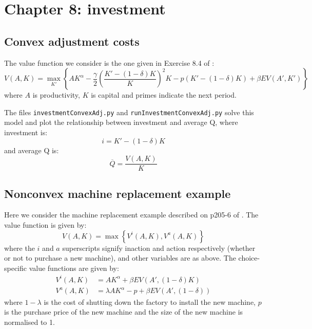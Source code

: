 \section{Chapter 8: investment}

\subsection{Convex adjustment costs} \label{sub:convex}

The value function we consider is the one given in Exercise 8.4 of \citet{adda2003dynamic}:
%
\begin{equation}
	V(A, K) = \max_{K'} \left\{ AK^{\alpha} - \frac{\gamma}{2}\left(\frac{K' - (1 - \delta)K}{K}\right)^2 K - p(K' - (1 - \delta)K) + \beta EV(A', K') \right\}
\end{equation}
%
where \(A\) is productivity, \(K\) is capital and primes indicate the next period.

The files \texttt{investmentConvexAdj.py} and \texttt{runInvestmentConvexAdj.py} solve this model and plot the relationship between investment and average Q, where investment is:
%
\begin{equation}
	i = K' - (1 - \delta)K
\end{equation}
%
and average Q is:
%
\begin{equation}
	\overline{Q} = \frac{V(A, K)}{K}
\end{equation}
%

\subsection{Nonconvex machine replacement example}

Here we consider the machine replacement example described on p205-6 of \citet{adda2003dynamic}. The value function is given by:
%
\begin{equation}
	V(A, K) = \max \left\{ V^i(A, K), V^a(A, K) \right\}
\end{equation}
%
where the \(i\) and \(a\) superscripts signify inaction and action respectively (whether or not to purchase a new machine), and other variables are as above. The choice-specific value functions are given by:
%
\begin{align}
 V^i(A, K) &=  AK^{\alpha} + \beta E V(A', (1 - \delta)K) \\
 V^a(A, K) &=  \lambda AK^{\alpha} - p + \beta E V(A', (1 - \delta))
\end{align}
%
where \(1 - \lambda\) is the cost of shutting down the factory to install the new machine, \(p\) is the purchase price of the new machine and the size of the new machine is normalised to 1.

